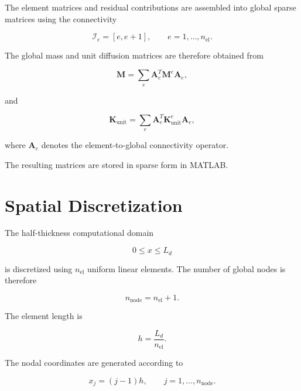 \documentclass[a4paper,12pt,oneside]{report}
\begin{document}
The element matrices and residual contributions are assembled into
global sparse matrices using the connectivity

\begin{equation}
\mathcal{I}_e=[e,e+1],
\qquad
e=1,\ldots,n_{\mathrm{el}}.
\end{equation}

The global mass and unit diffusion matrices are therefore obtained
from

\begin{equation}
\mathbf{M}
=
\sum_e
\mathbf{A}_e^T
\mathbf{M}^e
\mathbf{A}_e,
\end{equation}

and

\begin{equation}
\mathbf{K}_{\mathrm{unit}}
=
\sum_e
\mathbf{A}_e^T
\mathbf{K}_{\mathrm{unit}}^e
\mathbf{A}_e,
\end{equation}

where $\mathbf{A}_e$ denotes the element-to-global connectivity
operator.

The resulting matrices are stored in sparse form in MATLAB.

\section{Spatial Discretization}
\label{sec:ch3_spatial}

The half-thickness computational domain

\begin{equation}
0\leq x\leq L_d
\end{equation}

is discretized using $n_{\mathrm{el}}$ uniform linear elements.
The number of global nodes is therefore

\begin{equation}
n_{\mathrm{node}}
=
n_{\mathrm{el}}+1.
\end{equation}

The element length is

\begin{equation}
h
=
\frac{L_d}{n_{\mathrm{el}}}.
\end{equation}

The nodal coordinates are generated according to

\begin{equation}
x_j=(j-1)h,
\qquad
j=1,\ldots,n_{\mathrm{node}}.
\end{equation}
\end{document}
